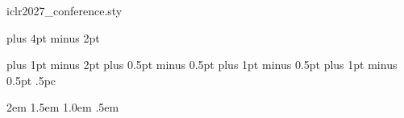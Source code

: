 \begin{filecontents*}[overwrite]{iclr2027_conference.sty}
\renewenvironment{abstract}{\vskip.075in\centerline{\large\sc
Abstract}\vspace{0.5ex}\begin{quote}}{\par\end{quote}\vskip 1ex}

\def\section{\@startsection {section}{1}{\z@}{-2.0ex plus
    -0.5ex minus -.2ex}{1.5ex plus 0.3ex
minus0.2ex}{\large\sc\raggedright}}

\def\subsection{\@startsection{subsection}{2}{\z@}{-1.8ex plus
-0.5ex minus -.2ex}{0.8ex plus .2ex}{\normalsize\sc\raggedright}}
\def\subsubsection{\@startsection{subsubsection}{3}{\z@}{-1.5ex
plus      -0.5ex minus -.2ex}{0.5ex plus
.2ex}{\normalsize\sc\raggedright}}
\def\paragraph{\@startsection{paragraph}{4}{\z@}{1.5ex plus
0.5ex minus .2ex}{-1em}{\normalsize\bf}}
\def\subparagraph{\@startsection{subparagraph}{5}{\z@}{1.5ex plus
  0.5ex minus .2ex}{-1em}{\normalsize\sc}}
\def\subsubsubsection{\vskip
5pt{\noindent\normalsize\rm\raggedright}}


\footnotesep 6.65pt %
\skip\footins 9pt plus 4pt minus 2pt
\def\footnoterule{\kern-3pt \hrule width 12pc \kern 2.6pt }
\setcounter{footnote}{0}

\parindent 0pt
\topsep 4pt plus 1pt minus 2pt
\partopsep 1pt plus 0.5pt minus 0.5pt
\itemsep 2pt plus 1pt minus 0.5pt
\parsep 2pt plus 1pt minus 0.5pt
\parskip .5pc


\leftmargini\leftmargin \leftmarginii 2em
\leftmarginiii 1.5em \leftmarginiv 1.0em \leftmarginv .5em


\def\@listi{\leftmargin\leftmargini}
\def\@listii{\leftmargin\leftmarginii
   \labelwidth\leftmarginii\advance\labelwidth-\labelsep
   \topsep 2pt plus 1pt minus 0.5pt
   \parsep 1pt plus 0.5pt minus 0.5pt
   \itemsep \parsep}
\def\@listiii{\leftmargin\leftmarginiii
    \labelwidth\leftmarginiii\advance\labelwidth-\labelsep
    \topsep 1pt plus 0.5pt minus 0.5pt
    \parsep \z@ \partopsep 0.5pt plus 0pt minus 0.5pt
    \itemsep \topsep}
\def\@listiv{\leftmargin\leftmarginiv
     \labelwidth\leftmarginiv\advance\labelwidth-\labelsep}
\def\@listv{\leftmargin\leftmarginv
     \labelwidth\leftmarginv\advance\labelwidth-\labelsep}
\def\@listvi{\leftmargin\leftmarginvi
     \labelwidth\leftmarginvi\advance\labelwidth-\labelsep}


\end{filecontents*}
